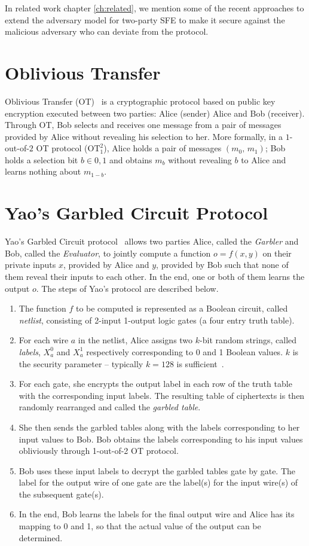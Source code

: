 In related work chapter \ref{ch:related}, we mention some of the recent approaches to extend the adversary model for two-party SFE to make it secure against the malicious adversary who can deviate from the protocol.

\section{Oblivious Transfer}\label{sec:prelim_OT}
Oblivious Transfer (OT)~\cite{NaorP05} is a cryptographic protocol based on public key encryption executed between two parties: Alice (sender) Alice and Bob (receiver).
Through OT, Bob selects and receives one message from a pair of messages provided by Alice without revealing his selection to her.
More formally, in a $1$-out-of-$2$ OT protocol ($\textrm{OT}^2_1$), Alice holds a pair of messages $(m_{0},\, m_{1})$; Bob holds a selection bit $b \in {0,1}$ and obtains $m_{b}$ without revealing $b$ to Alice and learns nothing about $m_{1-b}$.

\section{Yao's Garbled Circuit Protocol}\label{sec:prelim_gc}
Yao's Garbled Circuit protocol~\cite{Yao86} allows two parties Alice, called the \textit{Garbler} and Bob, called the \textit{Evaluator}, to jointly compute a function $o = f(x, y)$ on their private inputs $x$, provided by Alice and $y$, provided by Bob such that none of them reveal their inputs to each other.
In the end, one or both of them learns the output $o$.
The steps of Yao's protocol are described below.

\begin{enumerate}[label=\roman*.]
\item The function $f$ to be computed is represented as a Boolean circuit, called \textit{netlist}, consisting of 2-input 1-output logic gates (a four entry truth table).
\item For each wire $a$ in the netlist, Alice assigns two $k$-bit random strings, called \textit{labels}, $X_a^{0}$ and $X_a^{1}$ respectively corresponding to 0 and 1 Boolean values.
      $k$ is the security parameter -- typically $k=128$ is sufficient~\cite{bellare2013efficient}.
\item For each gate, she encrypts the output label in each row of the truth table with the corresponding input labels.
      The resulting table of ciphertexts is then randomly rearranged and called the \textit{garbled table}.
\item She then sends the garbled tables along with the labels corresponding to her input values to Bob.
      Bob obtains the labels corresponding to his input values obliviously through 1-out-of-2 OT protocol.
\item Bob uses these input labels to decrypt the garbled tables gate by gate.
      The label for the output wire of one gate are the label(s) for the input wire(s) of the subsequent gate(s).
\item In the end, Bob learns the labels for the final output wire and Alice has its mapping to 0 and 1, so that the actual value of the output can be determined.
\end{enumerate}

